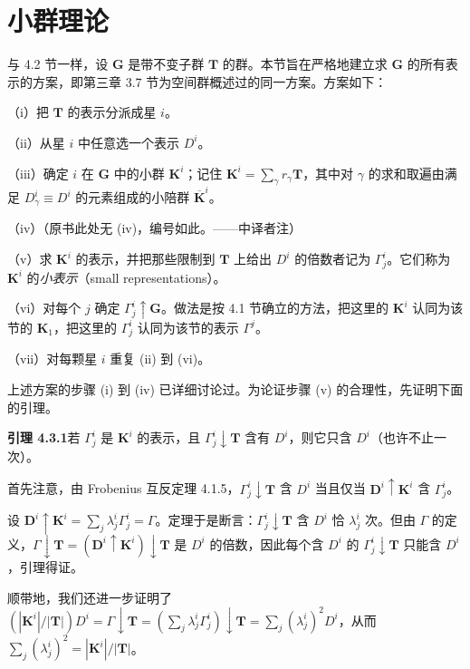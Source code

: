 \section{小群理论}

与 4.2 节一样，设 $\mathbf{G}$ 是带不变子群 $\mathbf{T}$ 的群。本节旨在严格地建立求 $\mathbf{G}$ 的所有表示的方案，即第三章 3.7 节为空间群概述过的同一方案。方案如下：

（i）把 $\mathbf{T}$ 的表示分派成星 $i$。

（ii）从星 $i$ 中任意选一个表示 $D^{i}$。

（iii）确定 $i$ 在 $\mathbf{G}$ 中的小群 $\mathbf{K}^{i}$；记住 $\mathbf{K}^{i} = \sum_{\gamma}r_{\gamma}\mathbf{T}$，其中对 $\gamma$ 的求和取遍由满足 $D^{i}_{\gamma} \equiv D^{i}$ 的元素组成的小陪群 $\overline{\mathbf{K}}^{i}$。

（iv）（原书此处无 (iv)，编号如此。——中译者注）

（v）求 $\mathbf{K}^{i}$ 的表示，并把那些限制到 $\mathbf{T}$ 上给出 $D^{i}$ 的倍数者记为 $\Gamma^{i}_{j}$。它们称为 $\mathbf{K}^{i}$ 的\textit{小表示}（small representations）。

（vi）对每个 $j$ 确定 $\Gamma^{i}_{j} \uparrow \mathbf{G}$。做法是按 4.1 节确立的方法，把这里的 $\mathbf{K}^{i}$ 认同为该节的 $\mathbf{K}_{1}$，把这里的 $\Gamma^{i}_{j}$ 认同为该节的表示 $\Gamma^{j}$。

（vii）对每颗星 $i$ 重复 (ii) 到 (vi)。

上述方案的步骤 (i) 到 (iv) 已详细讨论过。为论证步骤 (v) 的合理性，先证明下面的引理。

\noindent\textbf{引理 4.3.1}\quad 若 $\Gamma^{i}_{j}$ 是 $\mathbf{K}^{i}$ 的表示，且 $\Gamma^{i}_{j} \downarrow \mathbf{T}$ 含有 $D^{i}$，则它只含 $D^{i}$（也许不止一次）。

首先注意，由 Frobenius 互反定理 4.1.5，$\Gamma^{i}_{j} \downarrow \mathbf{T}$ 含 $D^{i}$ 当且仅当 $\mathbf{D}^{i} \uparrow \mathbf{K}^{i}$ 含 $\Gamma^{i}_{j}$。

设 $\mathbf{D}^{i} \uparrow \mathbf{K}^{i} = \sum_{j}\lambda^{i}_{j}\Gamma^{i}_{j} = \Gamma$。定理于是断言：$\Gamma^{i}_{j} \downarrow \mathbf{T}$ 含 $D^{i}$ 恰 $\lambda^{i}_{j}$ 次。但由 $\Gamma$ 的定义，$\Gamma \downarrow \mathbf{T} = (\mathbf{D}^{i} \uparrow \mathbf{K}^{i}) \downarrow \mathbf{T}$ 是 $D^{i}$ 的倍数，因此每个含 $D^{i}$ 的 $\Gamma^{i}_{j} \downarrow \mathbf{T}$ 只能含 $D^{i}$，引理得证。

顺带地，我们还进一步证明了 $(|\mathbf{K}^{i}|/|\mathbf{T}|)D^{i} = \Gamma \downarrow \mathbf{T} = (\sum_{j}\lambda^{i}_{j}\Gamma^{i}_{j}) \downarrow \mathbf{T} = \sum_{j}(\lambda^{i}_{j})^{2}D^{i}$，从而 $\sum_{j}(\lambda^{i}_{j})^{2} = |\mathbf{K}^{i}|/|\mathbf{T}|$。

